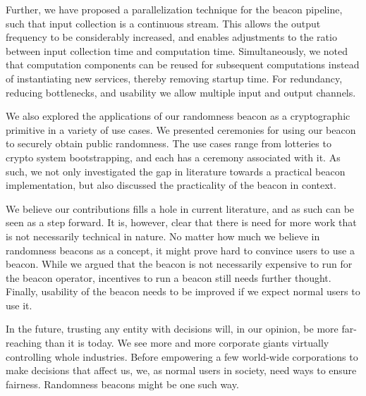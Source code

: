 Further, we have proposed a parallelization technique for the beacon pipeline, such that input collection is a continuous stream.
This allows the output frequency to be considerably increased, and enables adjustments to the ratio between input collection time and computation time.
Simultaneously, we noted that computation components can be reused for subsequent computations instead of instantiating new services, thereby removing startup time.
For redundancy, reducing bottlenecks, and usability we allow multiple input and output channels.

We also explored the applications of our randomness beacon as a cryptographic primitive in a variety of use cases.
We presented ceremonies for using our beacon to securely obtain public randomness.
The use cases range from lotteries to crypto system bootstrapping, and each has a ceremony associated with it.
As such, we not only investigated the gap in literature towards a practical beacon implementation, but also discussed the practicality of the beacon in context.

We believe our contributions fills a hole in current literature, and as such can be seen as a step forward.
It is, however, clear that there is need for more work that is not necessarily technical in nature.
No matter how much we believe in randomness beacons as a concept, it might prove hard to convince users to use a beacon.
While we argued that the beacon is not necessarily expensive to run for the beacon operator, incentives to run a beacon still needs further thought.
Finally, usability of the beacon needs to be improved if we expect normal users to use it.

In the future, trusting any entity with decisions will, in our opinion, be more far-reaching than it is today.
We see more and more corporate giants virtually controlling whole industries.
Before empowering a few world-wide corporations to make decisions that affect us, we, as normal users in society, need ways to ensure fairness.
Randomness beacons might be one such way.

